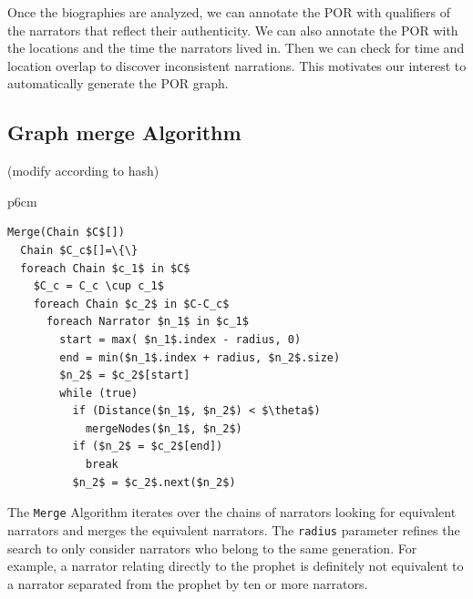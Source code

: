 \documentclass{llncs}
\newcommand{\CodeIn}[1]{{\small\texttt{#1}}}
\begin{document}
Once the biographies are analyzed, we can annotate
the POR with qualifiers of the narrators that reflect
their authenticity. 
We can also annotate the POR with the locations and 
the time the narrators lived in. 
Then we can check for time and location overlap
to discover inconsistent narrations.
This motivates our interest to automatically generate 
the POR graph.


\subsection{Graph merge Algorithm}

(modify according to hash)

\begin{table}[tb]
\begin{tabular} {p{6cm}}
\begin{Verbatim}[fontsize=\relsize{-2},
frame=topline,framesep=4mm,label=\fbox{Merge Algorithm},
commandchars=\\\{\}, codes={\catcode`$=3\catcode`_=8}]
Merge(Chain $C$[])
  Chain $C_c$[]=\{\}
  foreach Chain $c_1$ in $C$ 
    $C_c = C_c \cup c_1$
    foreach Chain $c_2$ in $C-C_c$
      foreach Narrator $n_1$ in $c_1$
        start = max( $n_1$.index - radius, 0)
        end = min($n_1$.index + radius, $n_2$.size)
        $n_2$ = $c_2$[start]
        while (true)
          if (Distance($n_1$, $n_2$) < $\theta$)
            mergeNodes($n_1$, $n_2$)
          if ($n_2$ = $c_2$[end])
            break
          $n_2$ = $c_2$.next($n_2$)        
\end{Verbatim}
\end{tabular}
\label{t:merge}
\end{table}


The \CodeIn{Merge} Algorithm 
iterates over the chains of narrators looking 
for equivalent narrators and merges the equivalent
narrators.
The \CodeIn{radius} parameter refines the search 
to only consider narrators who belong to the same 
generation. 
For example, a narrator relating directly to the prophet
is definitely not equivalent to a narrator separated
from the prophet by ten or more narrators. 
\end{document}
